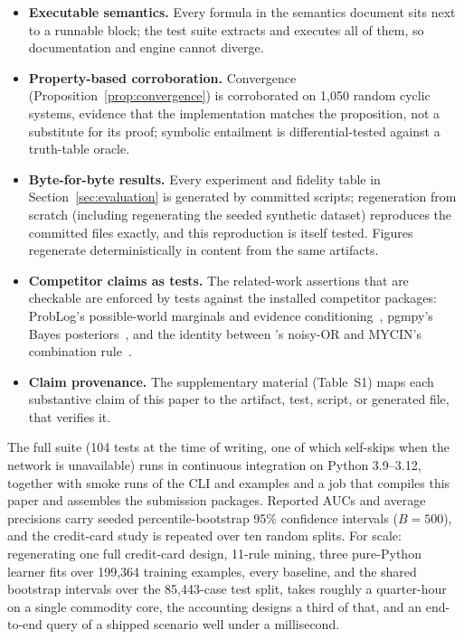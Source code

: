 \begin{itemize}
\item \textbf{Executable semantics.} Every formula in the semantics
  document sits next to a runnable block; the test suite extracts and
  executes all of them, so documentation and engine cannot diverge.
\item \textbf{Property-based corroboration.} Convergence
  (Proposition~\ref{prop:convergence}) is corroborated on 1{,}050 random
  cyclic systems, evidence that the implementation matches the
  proposition, not a substitute for its proof; symbolic entailment is
  differential-tested against a truth-table oracle.
\item \textbf{Byte-for-byte results.} Every experiment and fidelity
  table in Section~\ref{sec:evaluation} is generated by committed
  scripts; regeneration from scratch (including regenerating the seeded
  synthetic dataset) reproduces the committed files exactly, and this
  reproduction is itself tested. Figures regenerate deterministically
  in content from the same artifacts.
\item \textbf{Competitor claims as tests.} The related-work assertions
  that are checkable are enforced by tests against the installed
  competitor packages: ProbLog's possible-world marginals and evidence
  conditioning~\cite{deraedt2007}, pgmpy's Bayes
  posteriors~\cite{ankan2015}, and the identity between \pla{}'s
  noisy-OR and MYCIN's combination rule~\cite{shortliffe1975}.
\item \textbf{Claim provenance.} The supplementary material
  (Table~S1) maps each
  substantive claim of this paper to the artifact, test, script, or
  generated file, that verifies it.
\end{itemize}

The full suite (104 tests at the time of writing, one of which
self-skips when the network is unavailable) runs in continuous
integration on Python 3.9--3.12, together with smoke runs of the CLI and
examples and a job that compiles this paper and assembles the
submission packages. Reported AUCs and average precisions carry seeded
percentile-bootstrap 95\% confidence intervals ($B{=}500$), and the
credit-card study is repeated over ten random splits. For scale:
regenerating one full credit-card design, 11-rule mining, three
pure-Python learner fits over 199{,}364 training examples, every
baseline, and the shared bootstrap intervals over the 85{,}443-case
test split, takes roughly a quarter-hour on a single commodity
core, the accounting designs a third of that, and an end-to-end query
of a shipped scenario well under a millisecond.
